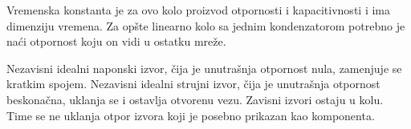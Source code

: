 Vremenska konstanta je za ovo kolo proizvod otpornosti i kapacitivnosti i ima dimenziju vremena. Za opšte linearno kolo sa jednim kondenzatorom potrebno je naći otpornost koju on vidi u ostatku mreže.

Nezavisni idealni naponski izvor, čija je unutrašnja otpornost nula, zamenjuje se kratkim spojem. Nezavisni idealni strujni izvor, čija je unutrašnja otpornost beskonačna, uklanja se i ostavlja otvorenu vezu. Zavisni izvori ostaju u kolu. Time se ne uklanja otpor izvora koji je posebno prikazan kao komponenta.

